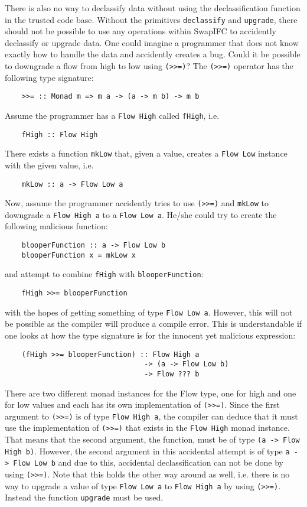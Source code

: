 There is also no way to declassify data without using the declassification function in the trusted code base. Without the primitives {\tt declassify} and {\tt upgrade}, there should not be possible to use any operations within SwapIFC to accidently declassify or upgrade data. One could imagine a programmer that does not know exactly how to handle the data and accidently creates a bug. Could it be possible to downgrade a flow from high to low using {\tt (>>=)}? The {\tt (>>=)} operator has the following type signature:
\begin{verbatim}
    >>= :: Monad m => m a -> (a -> m b) -> m b
\end{verbatim}
Assume the programmer has a {\tt Flow High} called {\tt fHigh}, i.e.
\begin{verbatim}
    fHigh :: Flow High
\end{verbatim}
There exists a function {\tt mkLow} that, given a value, creates a {\tt Flow Low} instance with the given value, i.e.
\begin{verbatim}
    mkLow :: a -> Flow Low a
\end{verbatim}
Now, assume the programmer accidently tries to use {\tt (>>=)} and {\tt mkLow} to downgrade a {\tt Flow High a} to a {\tt Flow Low a}. He/she could try to create the following malicious function:
\begin{verbatim}
    blooperFunction :: a -> Flow Low b
    blooperFunction x = mkLow x
\end{verbatim}
and attempt to combine {\tt fHigh} with {\tt blooperFunction}:
\begin{verbatim}
    fHigh >>= blooperFunction
\end{verbatim}
with the hopes of getting something of type {\tt Flow Low a}. However, this will not be possible as the compiler will produce a compile error. This is understandable if one looks at how the type signature is for the innocent yet malicious expression:
\begin{verbatim}
    (fHigh >>= blooperFunction) :: Flow High a
                                 -> (a -> Flow Low b)
                                 -> Flow ??? b
\end{verbatim}
There are two different monad instances for the Flow type, one for high and one for low values and each has its own implementation of {\tt (>>=)}. Since the first argument to {\tt (>>=)} is of type {\tt Flow High a}, the compiler can deduce that it must use the implementation of {\tt (>>=)} that exists in the {\tt Flow High} monad instance. That means that the second argument, the function, must be of type {\tt (a -> Flow High b)}. However, the second argument in this accidental attempt is of type {\tt a -> Flow Low b} and due to this, accidental declassification can not be done by using {\tt (>>=)}. Note that this holds the other way around as well, i.e. there is no way to upgrade a value of type {\tt Flow Low a} to {\tt Flow High a} by using {\tt (>>=)}. Instead the function {\tt upgrade} must be used.

